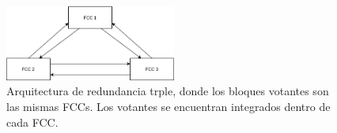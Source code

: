 \begin{figure}[H]
    \centering
    \includegraphics[width=0.5\textwidth]{img/3_5_TMR_2.png}
    \caption{Arquitectura de redundancia trple, donde los bloques votantes son las mismas FCCs. Los votantes se encuentran integrados dentro de cada FCC.}
    \label{fig:3_5_TMR_2}
\end{figure}






